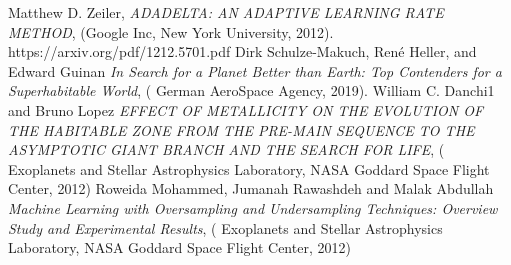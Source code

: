 \documentclass[11.5pt]{article}
\begin{document}
\newpage
\begin{thebibliography}{9}
 Matthew D. Zeiler, \textit{ADADELTA: AN ADAPTIVE LEARNING RATE METHOD}, (Google Inc, New York University, 2012). https://arxiv.org/pdf/1212.5701.pdf
 Dirk Schulze-Makuch, René Heller, and Edward Guinan \textit{In Search for a Planet Better than Earth: Top Contenders for a Superhabitable World}, ( German AeroSpace Agency, 2019). 
 William C. Danchi1 and Bruno Lopez \textit{EFFECT OF METALLICITY ON THE EVOLUTION OF THE HABITABLE ZONE FROM THE PRE-MAIN
SEQUENCE TO THE ASYMPTOTIC GIANT BRANCH AND THE SEARCH FOR LIFE}, ( Exoplanets and Stellar Astrophysics Laboratory, NASA Goddard Space Flight Center, 2012)
 Roweida Mohammed, Jumanah Rawashdeh and Malak Abdullah \textit{Machine Learning with Oversampling and
Undersampling Techniques: Overview Study and
Experimental Results}, ( Exoplanets and Stellar Astrophysics Laboratory, NASA Goddard Space Flight Center, 2012)
\end{thebibliography}
\\
\end{document}
